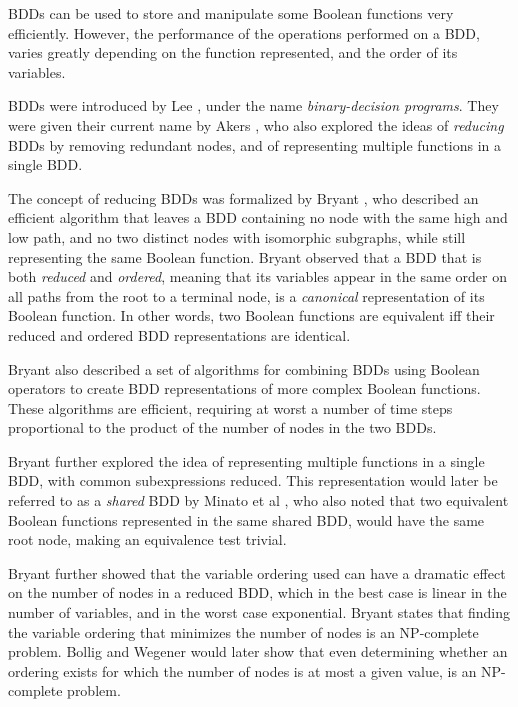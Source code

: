 \documentclass[a4paper,11pt]{kth-mag}
\begin{document}

BDDs can be used to store and manipulate some Boolean functions very efficiently.
However, the performance of the operations performed on a BDD, varies greatly depending on the function represented, and the order of its variables.

BDDs were introduced by Lee \cite{lee59}, under the name \emph{binary-decision programs}.
They were given their current name by Akers \cite{akers78}, who also explored the ideas of \emph{reducing} BDDs by removing redundant nodes, and of representing multiple functions in a single BDD.

The concept of reducing BDDs was formalized by Bryant \cite{bryant86}, who described an efficient algorithm that leaves a BDD containing no node with the same high and low path, and no two distinct nodes with isomorphic subgraphs, while still representing the same Boolean function.
Bryant observed that a BDD that is both \emph{reduced} and \emph{ordered}, meaning that its variables appear in the same order on all paths from the root to a terminal node, is a \emph{canonical} representation of its Boolean function.
In other words, two Boolean functions are equivalent iff their reduced and ordered BDD representations are identical.

Bryant also described a set of algorithms for combining BDDs using Boolean operators to create BDD representations of more complex Boolean functions.
These algorithms are efficient, requiring at worst a number of time steps proportional to the product of the number of nodes in the two BDDs.

Bryant further explored the idea of representing multiple functions in a single BDD, with common subexpressions reduced.
This representation would later be referred to as a \emph{shared} BDD by Minato et al \cite{minato90}, who also noted that two equivalent Boolean functions represented in the same shared BDD, would have the same root node, making an equivalence test trivial.

Bryant further showed that the variable ordering used can have a dramatic effect on the number of nodes in a reduced BDD, which in the best case is linear in the number of variables, and in the worst case exponential.
Bryant states that finding the variable ordering that minimizes the number of nodes is an NP-complete problem.
Bollig and Wegener \cite{bollig96} would later show that even determining whether an ordering exists for which the number of nodes is at most a given value, is an NP-complete problem.
\end{document}
